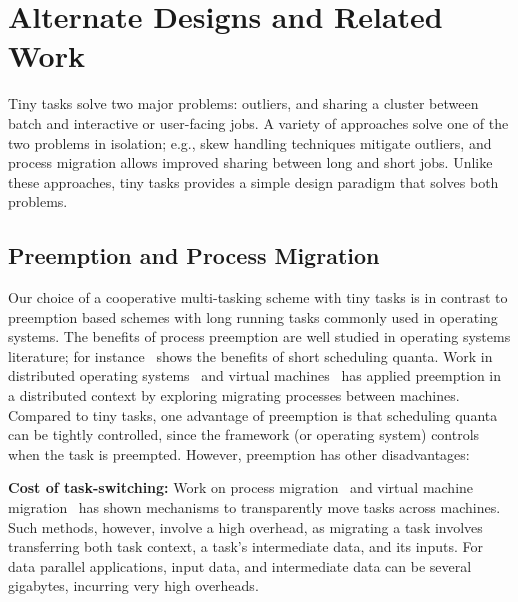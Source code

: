 \section{Alternate Designs and Related Work}
\label{sec:alternate}

Tiny tasks solve two major problems: outliers, and sharing
a cluster between batch and interactive or user-facing jobs. A variety of
approaches solve one of the two problems in isolation; e.g., skew handling
techniques mitigate outliers, and process migration allows improved
sharing between long and short jobs.  Unlike these approaches, tiny tasks
provides a simple design paradigm that solves both problems.

\subsection{Preemption and Process Migration}

Our choice of a cooperative multi-tasking scheme with tiny tasks 
is in contrast to preemption based schemes with long running tasks commonly used 
in operating systems. The benefits of process preemption are well studied in operating
systems literature; for instance~\cite{sherman1972trace} shows the benefits
of short scheduling quanta. Work in distributed
operating systems~\cite{douglis1991transparent,milojivcic2000process,rozier1991overview} and virtual machines~\cite{tanenbaum1990experiences}
has applied preemption in a distributed context by exploring migrating
processes between machines.
Compared to tiny tasks, one advantage of preemption is that scheduling quanta
can be tightly controlled, since the framework (or operating system) controls
when the task is preempted. However, preemption has other disadvantages:

\vspace{4pt}\noindent\textbf{Cost of task-switching:}
Work on process
migration~\cite{douglis1991transparent,milojivcic2000process} and virtual
machine migration~\cite{clark2005live} has shown mechanisms to transparently
move tasks across machines. Such methods, however, involve a high overhead, as
migrating a task involves transferring both task context, a task's intermediate
data, and its inputs. For data parallel applications, input data, and intermediate
data can be several gigabytes, incurring very high overheads.

